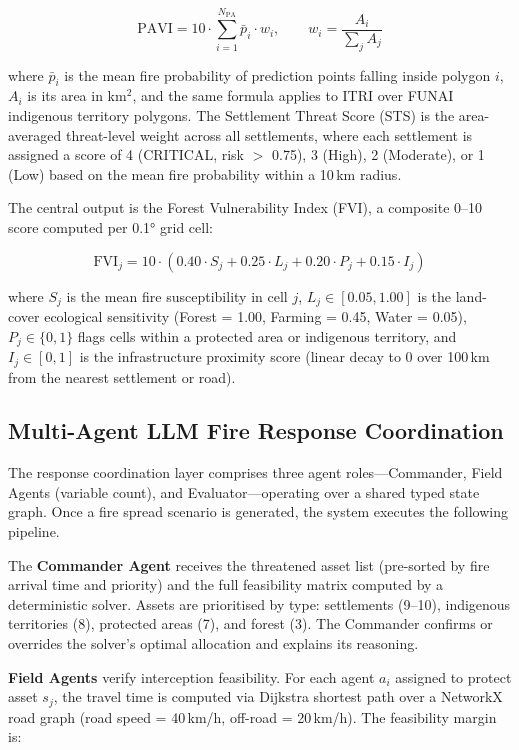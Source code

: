 \documentclass[12pt,a4paper]{article}
\begin{document}
\begin{equation}
\text{PAVI} = 10 \cdot \sum_{i=1}^{N_{\text{PA}}} \bar{p}_i \cdot w_i, \qquad w_i = \frac{A_i}{\sum_j A_j}
\end{equation}

where $\bar{p}_i$ is the mean fire probability of prediction points falling inside polygon $i$, $A_i$ is its area in km$^2$, and the same formula applies to ITRI over FUNAI indigenous territory polygons. The Settlement Threat Score (STS) is the area-averaged threat-level weight across all settlements, where each settlement is assigned a score of 4 (CRITICAL, risk $>$ 0.75), 3 (High), 2 (Moderate), or 1 (Low) based on the mean fire probability within a 10\,km radius.

The central output is the Forest Vulnerability Index (FVI), a composite 0--10 score computed per 0.1° grid cell:

\begin{equation}
\text{FVI}_{j} = 10 \cdot (0.40 \cdot S_j + 0.25 \cdot L_j + 0.20 \cdot P_j + 0.15 \cdot I_j)
\end{equation}

where $S_j$ is the mean fire susceptibility in cell $j$, $L_j \in [0.05, 1.00]$ is the land-cover ecological sensitivity (Forest = 1.00, Farming = 0.45, Water = 0.05), $P_j \in \{0, 1\}$ flags cells within a protected area or indigenous territory, and $I_j \in [0, 1]$ is the infrastructure proximity score (linear decay to 0 over 100\,km from the nearest settlement or road).

\subsection{Multi-Agent LLM Fire Response Coordination}

The response coordination layer comprises three agent roles---Commander, Field Agents (variable count), and Evaluator---operating over a shared typed state graph. Once a fire spread scenario is generated, the system executes the following pipeline.

The \textbf{Commander Agent} receives the threatened asset list (pre-sorted by fire arrival time and priority) and the full feasibility matrix computed by a deterministic solver. Assets are prioritised by type: settlements (9--10), indigenous territories (8), protected areas (7), and forest (3). The Commander confirms or overrides the solver's optimal allocation and explains its reasoning.

\textbf{Field Agents} verify interception feasibility. For each agent $a_i$ assigned to protect asset $s_j$, the travel time is computed via Dijkstra shortest path over a NetworkX road graph (road speed = 40\,km/h, off-road = 20\,km/h). The feasibility margin is:
\end{document}
